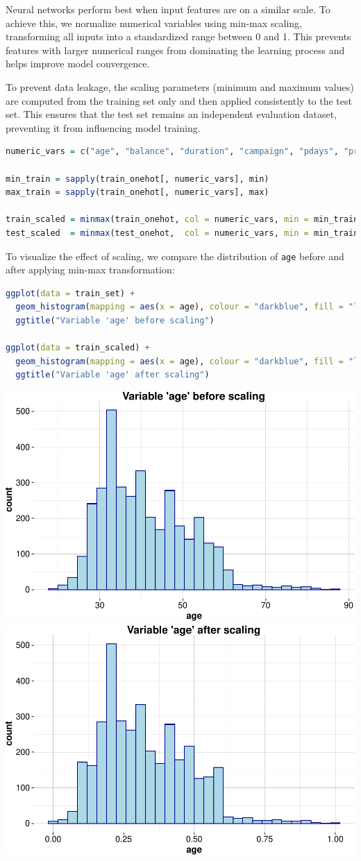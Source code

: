 \documentclass[
]{book}
\newcommand{\passthrough}[1]{#1}
\theoremstyle{definition}
\theoremstyle{definition}
\theoremstyle{definition}
\theoremstyle{definition}
\theoremstyle{remark}
\begin{document}
Neural networks perform best when input features are on a similar scale. To achieve this, we normalize numerical variables using min-max scaling, transforming all inputs into a standardized range between 0 and 1. This prevents features with larger numerical ranges from dominating the learning process and helps improve model convergence.

To prevent data leakage, the scaling parameters (minimum and maximum values) are computed from the training set only and then applied consistently to the test set. This ensures that the test set remains an independent evaluation dataset, preventing it from influencing model training.

\begin{lstlisting}[language=R]
numeric_vars = c("age", "balance", "duration", "campaign", "pdays", "previous")

min_train = sapply(train_onehot[, numeric_vars], min)
max_train = sapply(train_onehot[, numeric_vars], max)

train_scaled = minmax(train_onehot, col = numeric_vars, min = min_train, max = max_train)
test_scaled  = minmax(test_onehot,  col = numeric_vars, min = min_train, max = max_train)
\end{lstlisting}

To visualize the effect of scaling, we compare the distribution of \passthrough{\lstinline!age!} before and after applying min-max transformation:

\begin{lstlisting}[language=R]
ggplot(data = train_set) +
  geom_histogram(mapping = aes(x = age), colour = "darkblue", fill = "lightblue") +
  ggtitle("Variable 'age' before scaling")

ggplot(data = train_scaled) +
  geom_histogram(mapping = aes(x = age), colour = "darkblue", fill = "lightblue") +
  ggtitle("Variable 'age' after scaling")
\end{lstlisting}

\includegraphics[width=0.5\linewidth]{nn_files/figure-latex/unnamed-chunk-7-1} \includegraphics[width=0.5\linewidth]{nn_files/figure-latex/unnamed-chunk-7-2}
\end{document}
